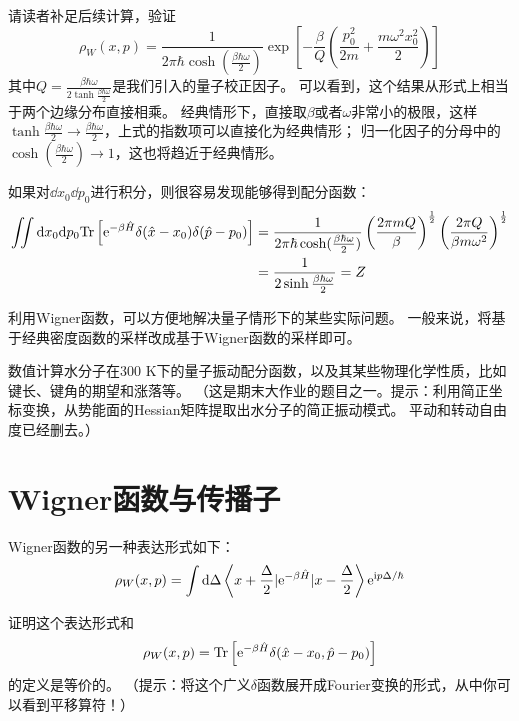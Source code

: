     请读者补足后续计算，验证
    \[
    \rho_W (x, p)
    = \frac{1}{2\pi \hbar \cosh (\frac{\beta\hbar\omega}{2})} \exp\left[-\frac{\beta}{Q}\left(\frac{p_0^2}{2m} + \frac{m\omega^2x_0^2}{2}\right)\right]
    \]
    其中\(Q = \frac{\beta\hbar\omega}{2\tanh \frac{\beta\hbar\omega}{2}}\)是我们引入的量子校正因子。
    可以看到，这个结果从形式上相当于两个边缘分布直接相乘。
    经典情形下，直接取\(\beta\)或者\(\omega\)非常小的极限，这样
    \(\tanh \frac{\beta\hbar\omega}{2}\rightarrow \frac{\beta\hbar\omega}{2}\)，上式的指数项可以直接化为经典情形；
    归一化因子的分母中的\(\cosh (\frac{\beta\hbar\omega}{2}) \rightarrow 1\)，这也将趋近于经典情形。


    如果对\(\dd x_0 \dd p_0\)进行积分，则很容易发现能够得到配分函数：
    \[
    \begin{aligned}
    \iint \mathrm{d} x_0 \mathrm{d} p_0 \textrm{Tr}\left[\mathrm{e}^{-\beta \hat{H}}\delta(\hat{x} - x_0)\delta(\hat{p} - p_0)\right]
    & = \frac{1}{2\pi \hbar \cosh (\frac{\beta\hbar\omega}{2})} \left(\frac{2\pi mQ}{\beta}\right)^{\frac{1}{2}} \left(\frac{2\pi Q}{\beta m \omega^2}\right)^{\frac{1}{2}}
    \\ &= \frac{1}{2\sinh \frac{\beta\hbar\omega}{2}}
    = Z
    \end{aligned}
    \]

    利用Wigner函数，可以方便地解决量子情形下的某些实际问题。
    一般来说，将基于经典密度函数的采样改成基于Wigner函数的采样即可。
    
    \begin{asg}
        数值计算水分子在300 K下的量子振动配分函数，以及其某些物理化学性质，比如键长、键角的期望和涨落等。
        （这是期末大作业的题目之一。提示：利用简正坐标变换，从势能面的Hessian矩阵提取出水分子的简正振动模式。
        平动和转动自由度已经删去。）
    \end{asg}

    \section{Wigner函数与传播子}

    Wigner函数的另一种表达形式如下：
    \[
        \rho_W(x, p) = \int \mathrm{d} \Delta \left< x + \frac{\Delta}{2} | \mathrm{e}^{-\beta\hat{H}} | x - \frac{\Delta}{2} \right> \mathrm{e}^{\mathrm{i} p\Delta / \hbar}
    \]
    
    \begin{asg}
        证明这个表达形式和\[\rho_W(x, p) = \textrm{Tr}\left[\mathrm{e}^{-\beta \hat{H}}\delta(\hat{x} - x_0, \hat{p} - p_0)\right]\]的定义是等价的。
        （提示：将这个广义\(\delta\)函数展开成Fourier变换的形式，从中你可以看到平移算符！）
    \end{asg}

